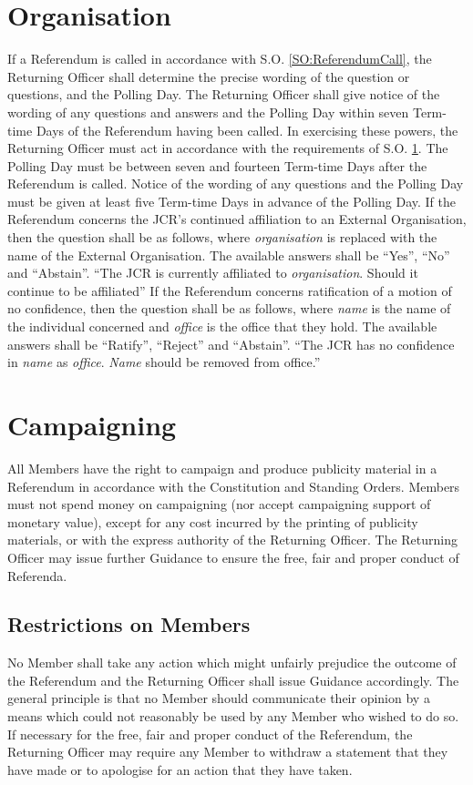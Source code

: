 \section{Organisation} \label{sec:ReferendumOrganisation}
\npara If a Referendum is called in accordance with S.O. \ref{SO:ReferendumCall}, the Returning Officer shall determine the precise wording of the question or questions, and the Polling Day. The Returning Officer shall give notice of the wording of any questions and answers and the Polling Day within seven Term-time Days of the Referendum having been called.  In exercising these powers, the Returning Officer must act in accordance with the requirements of S.O. \ref{sec:ReferendumOrganisation}.
\npara The Polling Day must be between seven and fourteen Term-time Days after the Referendum is called.  Notice of the wording of any questions and the Polling Day must be given at least five Term-time Days in advance of the Polling Day.
\npara If the Referendum concerns the JCR's continued affiliation to an External Organisation, then the question shall be as follows, where \textit{organisation} is replaced with the name of the External Organisation.  The available answers shall be ``Yes'', ``No'' and ``Abstain''.
``The JCR is currently affiliated to \textit{organisation}.  Should it continue to be affiliated''
\npara If the Referendum concerns ratification of a motion of no confidence, then the question shall be as follows, where \textit{name} is the name of the individual concerned and \textit{office} is the office that they hold.  The available answers shall be ``Ratify'', ``Reject'' and ``Abstain''.
``The JCR has no confidence in \textit{name} as \textit{office}.  \textit{Name} should be removed from office.''
\section{Campaigning}
\npara All Members have the right to campaign and produce publicity material in a Referendum in accordance with the Constitution and Standing Orders.
\npara Members must not spend money on campaigning (nor accept campaigning support of monetary value), except for any cost incurred by the printing of publicity materials, or with the express authority of the Returning Officer.
\npara The Returning Officer may issue further Guidance to ensure the free, fair and proper conduct of Referenda.
\subsection{Restrictions on Members}
\npara No Member shall take any action which might unfairly prejudice the outcome of the Referendum and the Returning Officer shall issue Guidance accordingly.  The general principle is that no Member should communicate their opinion by a means which could not reasonably be used by any Member who wished to do so.
\npara If necessary for the free, fair and proper conduct of the Referendum, the Returning Officer may require any Member to withdraw a statement that they have made or to apologise for an action that they have taken. 
